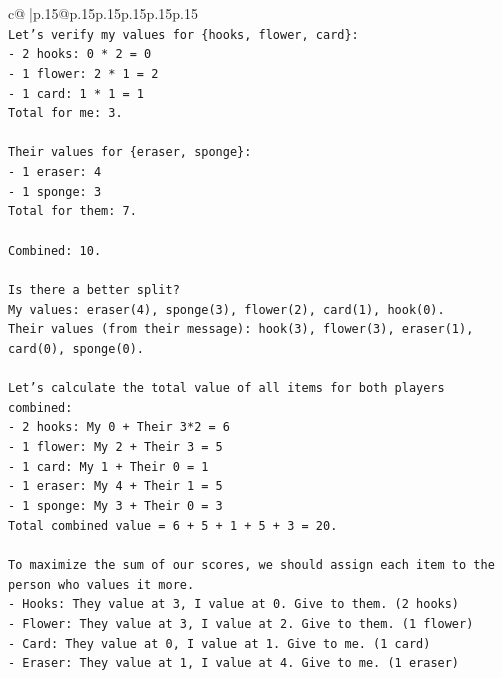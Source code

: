 \documentclass{article}
\begin{document}
{\begin{supertabular}{c@{$\;$}|p{.15\linewidth}@{}p{.15\linewidth}p{.15\linewidth}p{.15\linewidth}p{.15\linewidth}p{.15\linewidth}}
{{{\\ 
\texttt{Let's verify my values for \{hooks, flower, card\}:} \\
\texttt{{-} 2 hooks: 0 * 2 = 0} \\
\texttt{{-} 1 flower: 2 * 1 = 2} \\
\texttt{{-} 1 card: 1 * 1 = 1} \\
\texttt{Total for me: 3.} \\
\\ 
\texttt{Their values for \{eraser, sponge\}:} \\
\texttt{{-} 1 eraser: 4} \\
\texttt{{-} 1 sponge: 3} \\
\texttt{Total for them: 7.} \\
\\ 
\texttt{Combined: 10.} \\
\\ 
\texttt{Is there a better split?} \\
\texttt{My values: eraser(4), sponge(3), flower(2), card(1), hook(0).} \\
\texttt{Their values (from their message): hook(3), flower(3), eraser(1), card(0), sponge(0).} \\
\\ 
\texttt{Let's calculate the total value of all items for both players combined:} \\
\texttt{{-} 2 hooks: My 0 + Their 3*2 = 6} \\
\texttt{{-} 1 flower: My 2 + Their 3 = 5} \\
\texttt{{-} 1 card: My 1 + Their 0 = 1} \\
\texttt{{-} 1 eraser: My 4 + Their 1 = 5} \\
\texttt{{-} 1 sponge: My 3 + Their 0 = 3} \\
\texttt{Total combined value = 6 + 5 + 1 + 5 + 3 = 20.} \\
\\ 
\texttt{To maximize the sum of our scores, we should assign each item to the person who values it more.} \\
\texttt{{-} Hooks: They value at 3, I value at 0. Give to them. (2 hooks)} \\
\texttt{{-} Flower: They value at 3, I value at 2. Give to them. (1 flower)} \\
\texttt{{-} Card: They value at 0, I value at 1. Give to me. (1 card)} \\
\texttt{{-} Eraser: They value at 1, I value at 4. Give to me. (1 eraser)} \\
}}}
\end{supertabular}}
\end{document}
